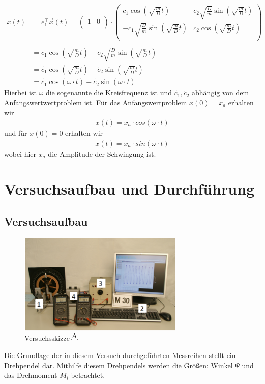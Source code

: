 \documentclass[fontsize=12pt]{scrartcl}
\begin{document}
\begin{align*}
x(t) &=
e^{\intercal}_1 \vec{x}(t)
=
\begin{pmatrix}
1 &0  \\
\end{pmatrix}
\cdot
\begin{pmatrix}
c_1 \cos(\sqrt{\frac{m}{D}}t) &c_2 \sqrt{\frac{D}{m}} \sin(\sqrt{\frac{m}{D}}t)  \\
-c_1 \sqrt{\frac{D}{m}} \sin(\sqrt{\frac{m}{D}}t) &c_2 \cos(\sqrt{\frac{m}{D}}t) \\
\end{pmatrix}\\
~\\
&=c_1 \cos(\sqrt{\frac{m}{D}}t) +c_2 \sqrt{\frac{D}{m}} \sin(\sqrt{\frac{m}{D}}t) \\
&=\tilde{c_1} \cos(\sqrt{\frac{m}{D}}t)  + \tilde{c_2}\sin(\sqrt{\frac{m}{D}}t) \\
&=\tilde{c_1} \cos(\omega \cdot t)  + \tilde{c_2}\sin(\omega \cdot t) 
\end{align*}
Hierbei ist $\omega$ die sogenannte die Kreisfrequenz ist und $\tilde{c_1}, \tilde{c_2}$ abhängig von dem Anfangswertwertproblem ist.
\newpage
Für das Anfangswertproblem $x(0)=x_a$ erhalten wir 
\begin{align*}
x(t)=x_a \cdot cos(\omega \cdot t)
\end{align*}
und für $x(0)=0$ erhalten wir
\begin{align*}
x(t)=x_a \cdot sin(\omega \cdot t)
\end{align*}
wobei hier $x_a$ die Amplitude der Schwingung ist.

\section{Versuchsaufbau und Durchführung}

\subsection{Versuchsaufbau}
\begin{figure}[H]
\centering
\vspace{-10pt}
                \includegraphics[width=0.7\textwidth]{Graphik/Versuch}
                \caption{Versuchsskizze$^{\cite{A}}$}
\end{figure}
\vspace{-10pt}
Die Grundlage der in diesem Versuch durchgeführten Messreihen stellt ein Drehpendel dar. Mithilfe diesem Drehpendels werden die Größen: Winkel $\Psi$ und das Drehmoment $M_i$ betrachtet.\par
\end{document}
